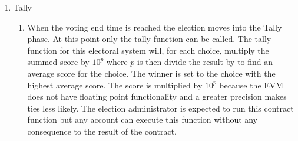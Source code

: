 \begin{enumerate}
  \item Tally
  \begin{enumerate}
    \item When the voting end time is reached the election moves into the
      Tally phase. At this point only the tally function can be called.
      The tally function for this electoral system will, for each choice,
      multiply the summed score by $10^p$ where $p$ is
       then divide the result by
       to find an average score for the choice. The
      winner is set to the choice with the highest average score. The
      score is multiplied by $10^p$ because the EVM does not have floating
      point functionality and a greater precision makes ties less likely.
      The election administrator is expected to run this contract function
      but any account can execute this function without any consequence to
      the result of the contract.
  \end{enumerate}
\end{enumerate}

